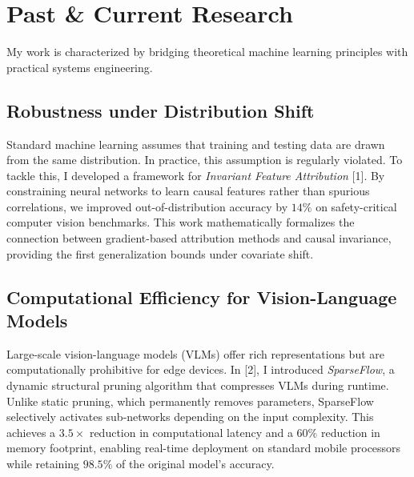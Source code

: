 \section{Past \& Current Research}
My work is characterized by bridging theoretical machine learning principles with practical systems engineering. 

\subsection{Robustness under Distribution Shift}
Standard machine learning assumes that training and testing data are drawn from the same distribution. In practice, this assumption is regularly violated. To tackle this, I developed a framework for \emph{Invariant Feature Attribution} [1]. By constraining neural networks to learn causal features rather than spurious correlations, we improved out-of-distribution accuracy by $14\%$ on safety-critical computer vision benchmarks. This work mathematically formalizes the connection between gradient-based attribution methods and causal invariance, providing the first generalization bounds under covariate shift.

\subsection{Computational Efficiency for Vision-Language Models}
Large-scale vision-language models (VLMs) offer rich representations but are computationally prohibitive for edge devices. In [2], I introduced \emph{SparseFlow}, a dynamic structural pruning algorithm that compresses VLMs during runtime. Unlike static pruning, which permanently removes parameters, SparseFlow selectively activates sub-networks depending on the input complexity. This achieves a $3.5\times$ reduction in computational latency and a $60\%$ reduction in memory footprint, enabling real-time deployment on standard mobile processors while retaining $98.5\%$ of the original model's accuracy.

